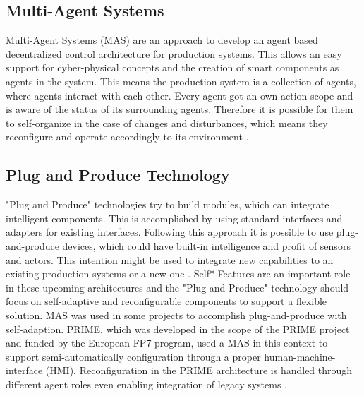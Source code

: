 \documentclass[conference,compsoc]{IEEEtran}
\begin{document}
\subsection{Multi-Agent Systems}
Multi-Agent Systems (MAS) are an approach to develop an agent based decentralized control architecture for production systems. This allows an easy support for cyber-physical concepts and the creation of smart components as agents in the system. This means the production system is a collection of agents, where agents interact with each other. Every agent got an own action scope and is aware of the status of its surrounding agents. Therefore it is possible for them to self-organize in the case of changes and disturbances, which means they reconfigure and operate accordingly to its environment \cite{HarmonizedSystems}.

\subsection{Plug and Produce Technology}
"Plug and Produce" technologies try to build modules, which can integrate intelligent components. This is accomplished by using standard interfaces and adapters for existing interfaces. Following this approach it is possible to use plug-and-produce devices, which could have built-in intelligence and profit of sensors and actors. This intention might be used to integrate new capabilities to an existing production systems or a new one \cite{HarmonizedSystems}. Self*-Features are an important role in these upcoming architectures \cite{SpecPERFoRM} and the "Plug and Produce" technology should focus on self-adaptive and reconfigurable components to support a flexible solution. MAS was used in some projects to accomplish plug-and-produce with self-adaption. PRIME, which was developed in the scope of the PRIME project and funded by the European FP7 program, used a MAS in this context to support semi-automatically configuration through a proper human-machine-interface (HMI). Reconfiguration in the PRIME architecture is handled through different agent roles even enabling integration of legacy systems \cite{HarmonizedSystems}.
\end{document}
